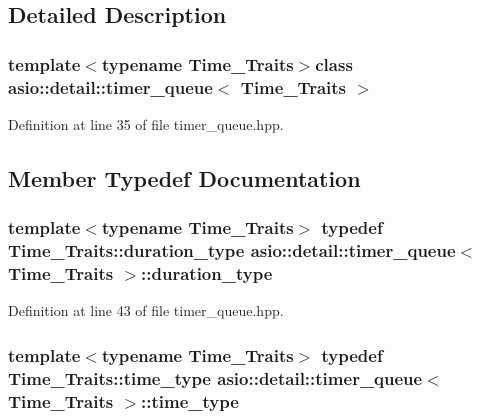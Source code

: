 \subsection{Detailed Description}
\subsubsection*{template$<$typename Time\+\_\+\+Traits$>$class asio\+::detail\+::timer\+\_\+queue$<$ Time\+\_\+\+Traits $>$}



Definition at line 35 of file timer\+\_\+queue.\+hpp.



\subsection{Member Typedef Documentation}
\hypertarget{classasio_1_1detail_1_1timer__queue_af8b576763396e5af620c640e253f4f54}{}
\subsubsection[{duration\+\_\+type}]{\setlength{\rightskip}{0pt plus 5cm}template$<$typename Time\+\_\+\+Traits$>$ typedef Time\+\_\+\+Traits\+::duration\+\_\+type {\bf asio\+::detail\+::timer\+\_\+queue}$<$ Time\+\_\+\+Traits $>$\+::{\bf duration\+\_\+type}}\label{classasio_1_1detail_1_1timer__queue_af8b576763396e5af620c640e253f4f54}


Definition at line 43 of file timer\+\_\+queue.\+hpp.

\hypertarget{classasio_1_1detail_1_1timer__queue_aed8a9658d61debbeb8d201f4dc74e139}{}
\subsubsection[{time\+\_\+type}]{\setlength{\rightskip}{0pt plus 5cm}template$<$typename Time\+\_\+\+Traits$>$ typedef Time\+\_\+\+Traits\+::time\+\_\+type {\bf asio\+::detail\+::timer\+\_\+queue}$<$ Time\+\_\+\+Traits $>$\+::{\bf time\+\_\+type}}\label{classasio_1_1detail_1_1timer__queue_aed8a9658d61debbeb8d201f4dc74e139}


